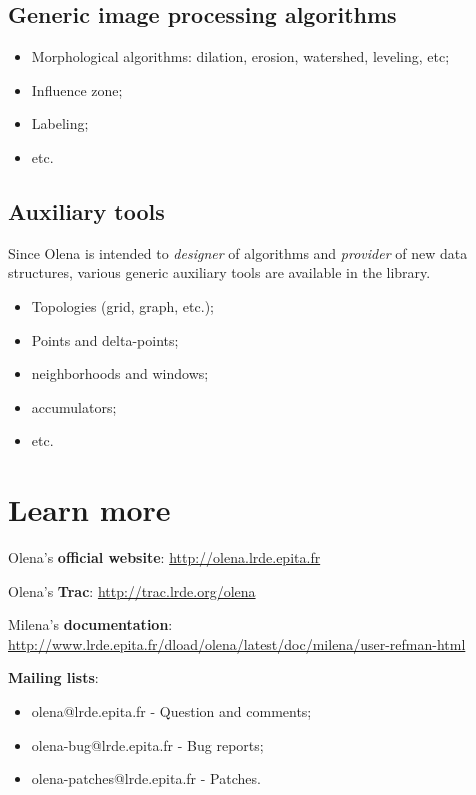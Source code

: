 \documentclass{article}
\begin{document}
\subsection{Generic image processing algorithms}

\begin{itemize}
  \item Morphological algorithms: dilation, erosion, watershed, leveling, etc;
  \item Influence zone;
  \item Labeling;
  \item etc.
\end{itemize}

\subsection{Auxiliary tools}

Since Olena is intended to \textit{designer} of algorithms and \textit{provider}
of new data structures, various generic auxiliary tools are available in the
library.

\begin{itemize}
  \item Topologies (grid, graph, etc.);
  \item Points and delta-points;
  \item neighborhoods and windows;
  \item accumulators;
  \item etc.
\end{itemize}



\section{Learn more}

Olena's \textbf{official website}: \url{http://olena.lrde.epita.fr}

Olena's \textbf{Trac}: \url{http://trac.lrde.org/olena}

Milena's \textbf{documentation}:
\url{http://www.lrde.epita.fr/dload/olena/latest/doc/milena/user-refman-html}

%
\medskip
%

\textbf{Mailing lists}:
\begin{itemize}
  \item olena@lrde.epita.fr - Question and comments;
  \item olena-bug@lrde.epita.fr - Bug reports;
  \item olena-patches@lrde.epita.fr - Patches.
\end {itemize}
\end{document}
